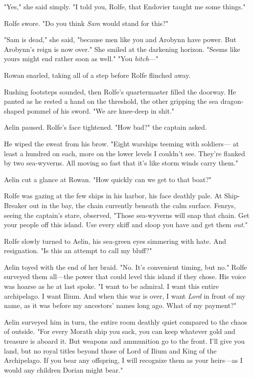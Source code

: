"Yes," she said simply. "I told you, Rolfe, that Endovier taught me some things."

Rolfe swore. "Do you think \emph{Sam} would stand for this?"

"Sam is dead," she said, "because men like you and Arobynn have power. But Arobynn's reign is now over." She smiled at the darkening horizon. "Seems like yours might end rather soon as well." "You
\emph{bitch}---"

Rowan snarled, taking all of a step before Rolfe flinched away.

Rushing footsteps sounded, then Rolfe's quartermaster filled the doorway. He panted as he rested a hand on the threshold, the other gripping the sea dragon-shaped pommel of his sword. "We are knee-deep in shit."

Aelin paused. Rolfe's face tightened. "How bad?" the captain asked.

He wiped the sweat from his brow. "Eight warships teeming with soldiers--- at least a hundred on each, more on the lower levels I couldn't see. They're flanked by two sea-wyverns. All moving so fast that it's like storm winds carry them."

Aelin cut a glance at Rowan. "How quickly can we get to that boat?"

Rolfe was gazing at the few ships in his harbor, his face deathly pale. At Ship-Breaker out in the bay, the chain currently beneath the calm surface. Fenrys, seeing the captain's stare, observed, "Those sea-wyverns will snap that chain. Get your people off this island. Use every skiff and sloop you have and get them \emph{out}."

Rolfe slowly turned to Aelin, his sea-green eyes simmering with hate. And resignation. "Is this an attempt to call my bluff?"

Aelin toyed with the end of her braid. "No. It's convenient timing, but no." Rolfe surveyed them all---the power that could level this island if they chose. His voice was hoarse as he at last spoke. "I want to be admiral. I want this entire archipelago. I want Ilium. And when this war is over, I want \emph{Lord} in front of my name, as it was before my ancestors' names long ago. What of my payment?"

Aelin surveyed him in turn, the entire room deathly quiet compared to the chaos of outside. "For every Morath ship you sack, you can keep whatever gold and treasure is aboard it. But weapons and ammunition go to the front. I'll give you land, but no royal titles beyond those of Lord of Ilium and King of the Archipelago. If you bear any offspring, I will recognize them as your heirs---as I would any children Dorian might bear."

